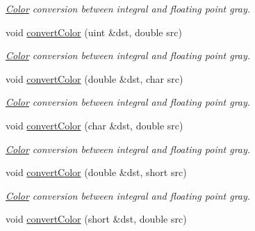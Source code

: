 \begin{DoxyCompactItemize}
\begin{DoxyCompactList}\small\item\em \hyperlink{class_d_o_1_1_color}{Color} conversion between integral and floating point gray. \end{DoxyCompactList}\item 
\hypertarget{group___color_conversion_ga2b893f95d48b0c7f87abcc49ed785493}{void \hyperlink{group___color_conversion_ga2b893f95d48b0c7f87abcc49ed785493}{convert\-Color} (uint \&dst, double src)}\label{group___color_conversion_ga2b893f95d48b0c7f87abcc49ed785493}

\begin{DoxyCompactList}\small\item\em \hyperlink{class_d_o_1_1_color}{Color} conversion between integral and floating point gray. \end{DoxyCompactList}\item 
\hypertarget{group___color_conversion_ga13c963adaff605c177e4f4e5827645e6}{void \hyperlink{group___color_conversion_ga13c963adaff605c177e4f4e5827645e6}{convert\-Color} (double \&dst, char src)}\label{group___color_conversion_ga13c963adaff605c177e4f4e5827645e6}

\begin{DoxyCompactList}\small\item\em \hyperlink{class_d_o_1_1_color}{Color} conversion between integral and floating point gray. \end{DoxyCompactList}\item 
\hypertarget{group___color_conversion_gafa121f60ad1fdb13a51e65294ec19b33}{void \hyperlink{group___color_conversion_gafa121f60ad1fdb13a51e65294ec19b33}{convert\-Color} (char \&dst, double src)}\label{group___color_conversion_gafa121f60ad1fdb13a51e65294ec19b33}

\begin{DoxyCompactList}\small\item\em \hyperlink{class_d_o_1_1_color}{Color} conversion between integral and floating point gray. \end{DoxyCompactList}\item 
\hypertarget{group___color_conversion_ga50a8d828c5c4d4fa0acaf3f9660bdf76}{void \hyperlink{group___color_conversion_ga50a8d828c5c4d4fa0acaf3f9660bdf76}{convert\-Color} (double \&dst, short src)}\label{group___color_conversion_ga50a8d828c5c4d4fa0acaf3f9660bdf76}

\begin{DoxyCompactList}\small\item\em \hyperlink{class_d_o_1_1_color}{Color} conversion between integral and floating point gray. \end{DoxyCompactList}\item 
\hypertarget{group___color_conversion_gadf9e5fe5ca24d599c7aad7752e4f89c5}{void \hyperlink{group___color_conversion_gadf9e5fe5ca24d599c7aad7752e4f89c5}{convert\-Color} (short \&dst, double src)}\label{group___color_conversion_gadf9e5fe5ca24d599c7aad7752e4f89c5}


\end{DoxyCompactItemize}
